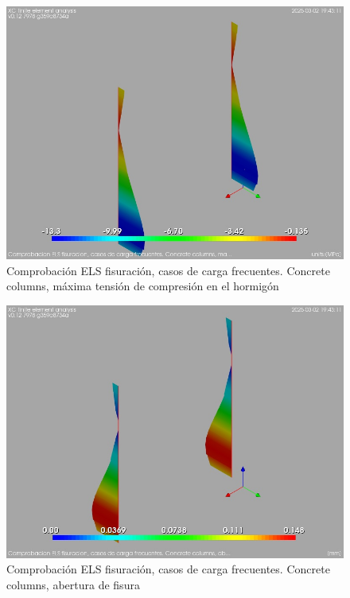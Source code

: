 \begin{figure}[ht]
\begin{center}
\includegraphics[width=\linewidth]{results/graphics/crackingSLS_freq/columnZconcrsigma_c}
\caption{Comprobación ELS fisuración, casos de carga frecuentes. Concrete columns, máxima tensión de compresión en el hormigón}
\label{SLS_frequentLoadsCrackControlcolumnZconcrsigma_c}
\end{center}
\end{figure}
\begin{figure}[ht]
\begin{center}
\includegraphics[width=\linewidth]{results/graphics/crackingSLS_freq/columnZconcrwk}
\caption{Comprobación ELS fisuración, casos de carga frecuentes. Concrete columns, abertura de fisura}
\label{SLS_frequentLoadsCrackControlcolumnZconcrwk}
\end{center}
\end{figure}
